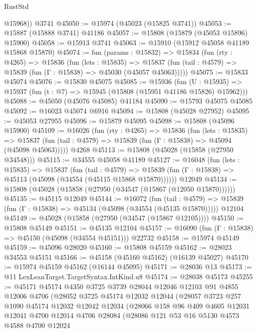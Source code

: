 \begin{lexlean}{RustStd}
\begin{coremodule}
        @15968))
    @3741
@45050 := @15974 (@45023 (@15825 @3741))
@45053 := @15887 (@15888 @3741) @41186
@45057 := @15808 (@15879 (@45053 @15896) @15900)
@45058 := @15913 @3741
@45063 := @15910 (@15912 @45058 @41189 @15868 @15870)
@45074 := fun (params : @15832) =>
  @15834
    (fun (rty : @4265) =>
    @15836
      (fun (lets : @15835) =>
      @15837 (fun (tail : @4579) => @15839 (fun (Γ : @15838) => @45030 (@45057 @45063)))))
@45075 := @15833 @45074
@45076 := @15830 @45075
@45085 := @15936
    (fun (U : @15935) => @15937 (fun (t : @7) => @15945 (@15808 (@15951 @41186 @15826) @15962)))
@45088 := @45050 (@45076 @45085) @41184
@45090 := @15793 @45075 @45085
@45092 := @16023 @45074 @6916
@45094 := @15808 (@45028 @27952)
@45095 := @45053 @27955
@45096 := @15879 @45095
@45098 := @15808 (@45096 @15900)
@45109 := @16026
    (fun (rty : @4265) =>
    @15836
      (fun (lets : @15835) =>
      @15837 (fun (tail : @4579) => @15839 (fun (Γ : @15838) => @45094 (@45098 @45063)))))
    @4268
@45113 := @15808 (@45028 (@15858 (@27950 @34548)))
@45115 := @34555 @45058 @41189
@45127 := @16048
    (fun (lets : @15835) =>
    @15837
      (fun (tail : @4579) =>
      @15839 (fun (Γ : @15838) => @45113 (@45098 (@34554 (@45115 @15868 @15870))))))
    @12049
@45134 := @15808 (@45028 (@15858 (@27950 (@34547 (@15867 (@12050 @15870))))))
@45135 := @45115 @12049
@45144 := @16072
    (fun (tail : @4579) => @15839 (fun (Γ : @15838) => @45134 (@45098 (@34554 (@45135 @15870)))))
    @12104
@45149 := @45028 (@15858 (@27950 (@34547 (@15867 @12105))))
@45150 := @15808 @45149
@45151 := @45135 @12104
@45157 := @16090 (fun (Γ : @15838) => @45150 (@45098 (@34554 @45151))) @22732
@45158 := @15974 @45149
@45159 := @45096 @28020
@45160 := @15808 @45159
@45162 := @28023 @34553 @45151
@45166 := @45158 (@45160 @45162) (@16139 @45027)
@45170 := @15974 @45159 @45162 (@16144 @45095)
@45171 := @28036 @13
@45173 := @11 LexLeanTarget.TargetSyntax.IntKind.u8
@45174 := @28038 @45173
@45255 := @45171
    @45174
    @4350
    @3725
    @3739
    @28044
    @12046
    @12103
    @91
    @4855
    @12006
    @4706
    (@28052
      @3725
      @45174
      @12032
      @12044
      (@28057
        @3723
        @257
        @1090
        @45174
        @12032
        @12042
        @12034
        (@28066
          @158
          @96
          @409
          @4605
          @12031
          @12041
          @4700
          @12014
          @4706
          @28084
          (@28086
            @121
            @53
            @16
            @5130
            @4573
            @4588
            @4700
            @12024

\end{coremodule}
\end{lexlean}
